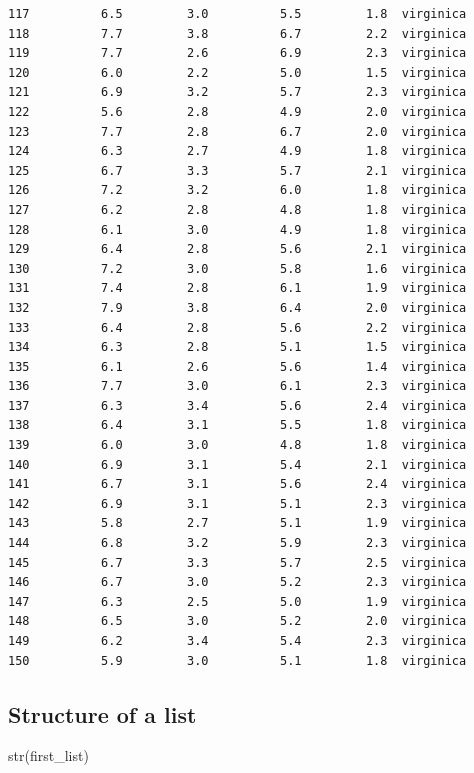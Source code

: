 \documentclass[
  letterpaper,
  DIV=11,
  numbers=noendperiod]{scrreprt}
\newenvironment{Shaded}{\begin{snugshade}}{\end{snugshade}}
\newcommand{\FunctionTok}[1]{\textcolor[rgb]{0.28,0.35,0.67}{#1}}
\newcommand{\NormalTok}[1]{\textcolor[rgb]{0.00,0.23,0.31}{#1}}
\begin{document}
\begin{verbatim}
117          6.5         3.0          5.5         1.8  virginica
118          7.7         3.8          6.7         2.2  virginica
119          7.7         2.6          6.9         2.3  virginica
120          6.0         2.2          5.0         1.5  virginica
121          6.9         3.2          5.7         2.3  virginica
122          5.6         2.8          4.9         2.0  virginica
123          7.7         2.8          6.7         2.0  virginica
124          6.3         2.7          4.9         1.8  virginica
125          6.7         3.3          5.7         2.1  virginica
126          7.2         3.2          6.0         1.8  virginica
127          6.2         2.8          4.8         1.8  virginica
128          6.1         3.0          4.9         1.8  virginica
129          6.4         2.8          5.6         2.1  virginica
130          7.2         3.0          5.8         1.6  virginica
131          7.4         2.8          6.1         1.9  virginica
132          7.9         3.8          6.4         2.0  virginica
133          6.4         2.8          5.6         2.2  virginica
134          6.3         2.8          5.1         1.5  virginica
135          6.1         2.6          5.6         1.4  virginica
136          7.7         3.0          6.1         2.3  virginica
137          6.3         3.4          5.6         2.4  virginica
138          6.4         3.1          5.5         1.8  virginica
139          6.0         3.0          4.8         1.8  virginica
140          6.9         3.1          5.4         2.1  virginica
141          6.7         3.1          5.6         2.4  virginica
142          6.9         3.1          5.1         2.3  virginica
143          5.8         2.7          5.1         1.9  virginica
144          6.8         3.2          5.9         2.3  virginica
145          6.7         3.3          5.7         2.5  virginica
146          6.7         3.0          5.2         2.3  virginica
147          6.3         2.5          5.0         1.9  virginica
148          6.5         3.0          5.2         2.0  virginica
149          6.2         3.4          5.4         2.3  virginica
150          5.9         3.0          5.1         1.8  virginica
\end{verbatim}

\subsection{Structure of a list}\label{structure-of-a-list}

\begin{Shaded}
\begin{Highlighting}[]
\FunctionTok{str}\NormalTok{(first\_list)}
\end{Highlighting}
\end{Shaded}
\end{document}
